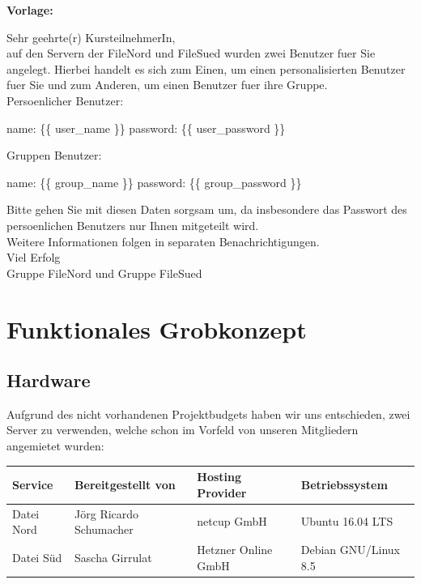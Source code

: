 \textbf{Vorlage:}
\begin{center}
\begin{framedminipage}{0.8\textwidth}
Sehr geehrte(r) KursteilnehmerIn,\\

auf den Servern der FileNord und FileSued wurden zwei Benutzer fuer Sie
angelegt. Hierbei handelt es sich zum Einen, um einen personalisierten Benutzer
fuer Sie und zum Anderen, um einen Benutzer fuer ihre Gruppe.\\
Persoenlicher Benutzer:\bigskip

  name: \{\{ user\_name \}\}
  password: \{\{ user\_password \}\}\bigskip

Gruppen Benutzer:\bigskip

  name: \{\{ group\_name \}\}
  password: \{\{ group\_password \}\}\bigskip

Bitte gehen Sie mit diesen Daten sorgsam um, da insbesondere das Passwort des
persoenlichen Benutzers nur Ihnen mitgeteilt wird.\\

Weitere Informationen folgen in separaten Benachrichtigungen.\\

Viel Erfolg\\

Gruppe FileNord und Gruppe FileSued
\end{framedminipage}
\end{center}

\newpage
\section{Funktionales Grobkonzept}

\subsection{Hardware}
\label{subsec:hardware}
Aufgrund des nicht vorhandenen Projektbudgets haben wir uns entschieden, zwei Server zu verwenden, welche schon im Vorfeld von unseren Mitgliedern angemietet wurden:

\begin{minipage}{\textwidth}
\begin{center}
\begin{tabular}{llll}
\toprule
Service & Bereitgestellt von & Hosting Provider & Betriebssystem \\
\midrule
Datei Nord & Jörg Ricardo Schumacher & netcup GmbH & Ubuntu 16.04 LTS \\
Datei Süd & Sascha Girrulat & Hetzner Online GmbH & Debian GNU/Linux 8.5 \\
\bottomrule
\end{tabular}
\end{center}
\end{minipage}\bigskip

